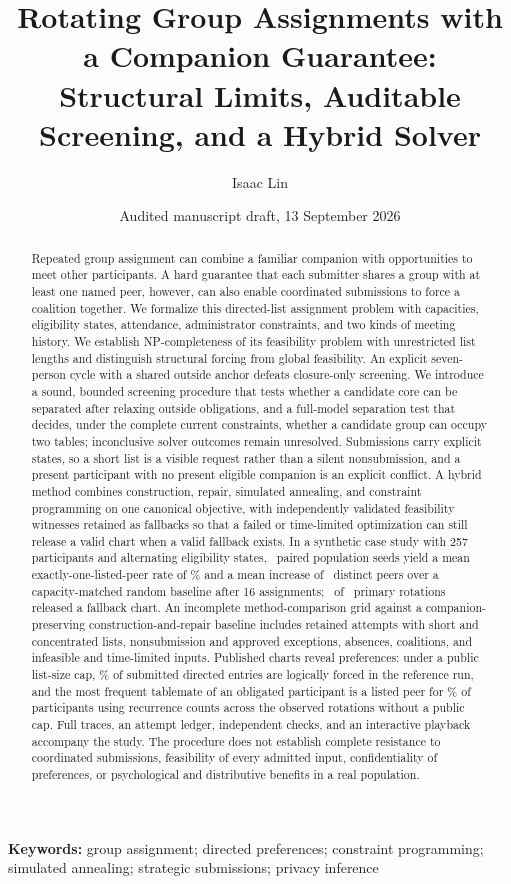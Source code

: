 \documentclass[11pt,a4paper]{article}
\title{Rotating Group Assignments with a Companion Guarantee:\\Structural Limits, Auditable Screening, and a Hybrid Solver}
\author{Isaac Lin\\\small \AuthorAffiliations}
\date{Audited manuscript draft, 13 September 2026}
\theoremstyle{definition}\newtheorem{definition}[theorem]{Definition}
\theoremstyle{remark}\newtheorem{remark}[theorem]{Remark}
\begin{document}
\maketitle
\begin{abstract}
Repeated group assignment can combine a familiar companion with opportunities to meet other participants. A hard guarantee that each submitter shares a group with at least one named peer, however, can also enable coordinated submissions to force a coalition together. We formalize this directed-list assignment problem with capacities, eligibility states, attendance, administrator constraints, and two kinds of meeting history. We establish NP-completeness of its feasibility problem with unrestricted list lengths and distinguish structural forcing from global feasibility. An explicit seven-person cycle with a shared outside anchor defeats closure-only screening. We introduce a sound, bounded screening procedure that tests whether a candidate core can be separated after relaxing outside obligations, and a full-model separation test that decides, under the complete current constraints, whether a candidate group can occupy two tables; inconclusive solver outcomes remain unresolved. Submissions carry explicit states, so a short list is a visible request rather than a silent nonsubmission, and a present participant with no present eligible companion is an explicit conflict. A hybrid method combines construction, repair, simulated annealing, and constraint programming on one canonical objective, with independently validated feasibility witnesses retained as fallbacks so that a failed or time-limited optimization can still release a valid chart when a valid fallback exists. In a synthetic case study with 257 participants and alternating eligibility states, \NSeeds\ paired population seeds yield a mean exactly-one-listed-peer rate of \SeedExactlyOneMean\% and a mean increase of \SeedDiffMean\ distinct peers over a capacity-matched random baseline after 16 assignments; \ReleaseFallback\ of \PrimaryRotations\ primary rotations released a fallback chart. An incomplete method-comparison grid against a companion-preserving construction-and-repair baseline includes retained attempts with short and concentrated lists, nonsubmission and approved exceptions, absences, coalitions, and infeasible and time-limited inputs. Published charts reveal preferences: under a public list-size cap, \LeakFraction\% of submitted directed entries are logically forced in the reference run, and the most frequent tablemate of an obligated participant is a listed peer for \ExposureTopOne\% of participants using recurrence counts across the observed rotations without a public cap. Full traces, an attempt ledger, independent checks, and an interactive playback accompany the study. The procedure does not establish complete resistance to coordinated submissions, feasibility of every admitted input, confidentiality of preferences, or psychological and distributive benefits in a real population.
\end{abstract}
\noindent\textbf{Keywords:} group assignment; directed preferences; constraint programming; simulated annealing; strategic submissions; privacy inference
\end{document}
